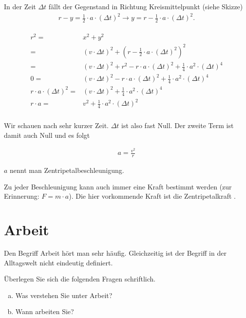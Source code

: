 \documentclass[12pt,a4paper,twoside]{article}
\def\dir{./Aufgaben_Mechanik/}
\newcommand{\Einbinden}[1]{}
\begin{document}
In der Zeit $\Delta t$ fällt der Gegenstand in Richtung Kreismittelpunkt (siehe Skizze)
\begin{eqnarray*}
	r-y = \frac{1}{2}\cdot a\cdot (\Delta t)^2 \to y = r - \frac{1}{2}\cdot a\cdot(\Delta t)^2\text{.}
\end{eqnarray*}

\begin{eqnarray*}
	\begin{split}
		r^2 = & x^2 + y^2\\
		    = & (v\cdot \Delta t)^2 + (r-\frac{1}{2}\cdot a\cdot (\Delta t)^2)^2\\
			= & (v\cdot \Delta t)^2 + r^2 - r\cdot a\cdot (\Delta t)^2 + \frac{1}{4}\cdot a^2 \cdot (\Delta t)^4\\
	0		= & (v\cdot \Delta t)^2 - r\cdot a\cdot (\Delta t)^2 + \frac{1}{4}\cdot a^2 \cdot (\Delta t)^4\\
	r\cdot a\cdot (\Delta t)^2		= & (v\cdot \Delta t)^2 + \frac{1}{4}\cdot a^2 \cdot (\Delta t)^4\\
	r\cdot a	= & v^2 + \frac{1}{4}\cdot a^2 \cdot (\Delta t)^2\\
	\end{split}
\end{eqnarray*}

Wir schauen nach sehr kurzer Zeit. $\Delta t$ ist also fast Null. 
Der zweite Term ist damit auch Null und es folgt

\begin{eqnarray*}
	a=\frac{v^2}{r}
\end{eqnarray*}

$a$ nennt man Zentripetalbeschleunigung.

Zu jeder Beschleunigung kann auch immer eine Kraft bestimmt werden (zur Erinnerung: $F=m\cdot a$).
Die hier vorkommende Kraft ist die Zentripetalkraft .


\Einbinden{\dir/kreisbewegung01.tex}
\Einbinden{\dir/kreisbewegung_kanone.tex}
\Einbinden{\dir/kreisbewegung_eimer.tex}
\Einbinden{\dir/kreisbewegung_reibung.tex}

\Einbinden{\dir/hammerwurf.tex}

\newpage


\section*{Arbeit}

\begin{aufgabe}
	Den Begriff Arbeit hört man sehr häufig.
	Gleichzeitig ist der Begriff in der Alltagswelt nicht eindeutig definiert.

Überlegen Sie sich die folgenden Fragen schriftlich.
\begin{enumerate}[a)]
	\item	Was verstehen Sie unter Arbeit?
	\item 	Wann arbeiten Sie?
\end{enumerate}

\end{aufgabe}
\end{document}

